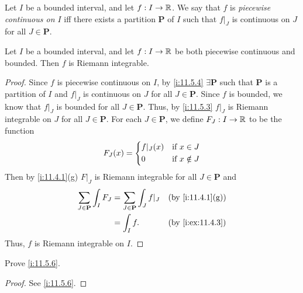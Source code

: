 \begin{defn}\label{i:11.5.4}
  Let \(I\) be a bounded interval, and let \(f : I \to \mathbb{R}\).
  We say that \(f\) is \emph{piecewise continuous on \(I\)} iff there exists a partition \(\mathbf{P}\) of \(I\) such that \(f|_J\) is continuous on \(J\) for all \(J \in \mathbf{P}\).
\end{defn}

\setcounter{thm}{5}
\begin{prop}\label{i:11.5.6}
  Let \(I\) be a bounded interval, and let \(f : I \to \mathbb{R}\) be both piecewise continuous and bounded.
  Then \(f\) is Riemann integrable.
\end{prop}

\begin{proof}
  Since \(f\) is piecewise continuous on \(I\), by \cref{i:11.5.4} \(\exists \mathbf{P}\) such that \(\mathbf{P}\) is a partition of \(I\) and \(f|_J\) is continuous on \(J\) for all \(J \in \mathbf{P}\).
  Since \(f\) is bounded, we know that \(f|_J\) is bounded for all \(J \in \mathbf{P}\).
  Thus, by \cref{i:11.5.3} \(f|_J\) is Riemann integrable on \(J\) for all \(J \in \mathbf{P}\).
  For each \(J \in \mathbf{P}\), we define \(F_J : I \to \mathbb{R}\) to be the function
  \[
    F_J(x) = \begin{dcases}
      f|_J(x) & \text{if } x \in J    \\
      0       & \text{if } x \notin J
    \end{dcases}
  \]
  Then by \cref{i:11.4.1}(g) \(F|_J\) is Riemann integrable for all \(J \in \mathbf{P}\) and
  \begin{align*}
    \sum_{J \in \mathbf{P}} \int_I F_J & = \sum_{J \in \mathbf{P}} \int_J f|_J &  & \by{i:11.4.1}[g] \\
                                       & = \int_I f.                           &  & \by{i:ex:11.4.3}
  \end{align*}
  Thus, \(f\) is Riemann integrable on \(I\).
\end{proof}

\exercisesection

\begin{ex}\label{i:ex:11.5.1}
  Prove \cref{i:11.5.6}.
\end{ex}

\begin{proof}
  See \cref{i:11.5.6}.
\end{proof}
